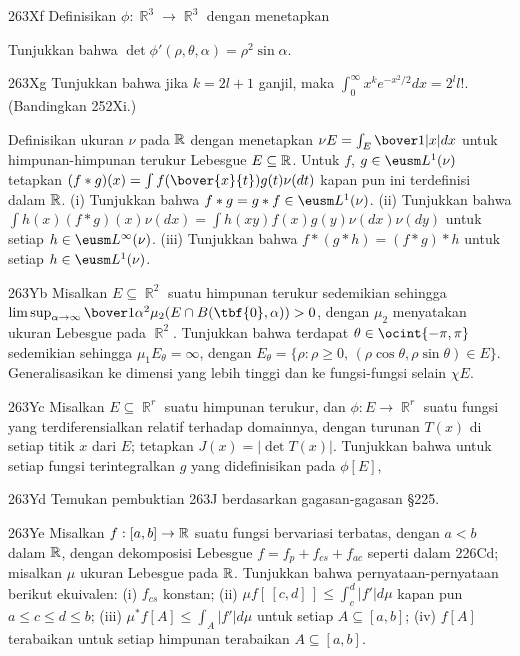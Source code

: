 {\sqheader 263Xf Definisikan $\phi:\BbbR^3\to\BbbR^3$ dengan
menetapkan


\noindent Tunjukkan bahwa $\det\phi'(\rho,\theta,\alpha)=\rho^2\sin\alpha$.

\spheader 263Xg Tunjukkan bahwa jika $k=2l+1$ ganjil, maka
$\int_0^{\infty}x^ke^{-x^2/2}dx=2^ll!$.   (Bandingkan 252Xi.)

Definisikan ukuran $\nu$ pada $\Bbb R$ dengan menetapkan
$\nu E=\int_E\bover1{|x|}dx$ untuk himpunan-himpunan terukur Lebesgue
$E\subseteq\Bbb R$.   Untuk $f$, $g\in\eusm L^1(\nu)$ tetapkan
$(f*g)(x)=\int f(\bover{x}{t})g(t)\nu(dt)$ kapan pun ini terdefinisi dalam
$\Bbb R$.   (i) Tunjukkan bahwa $f*g=g*f\in\eusm L^1(\nu)$.   (ii) Tunjukkan bahwa
$\int h(x)(f*g)(x)\nu(dx)=\int h(xy)f(x)g(y)\nu(dx)\nu(dy)$ untuk setiap
$h\in\eusm L^{\infty}(\nu)$.   (iii) Tunjukkan bahwa $f*(g*h)=(f*g)*h$ untuk
setiap $h\in\eusm L^1(\nu)$.   

\spheader 263Yb Misalkan $E\subseteq\BbbR^2$ suatu himpunan terukur sedemikian sehingga
$\limsup_{\alpha\to\infty}
\bover1{\alpha^2}\mu_2(E\cap B(\tbf{0},\alpha))>0$, dengan $\mu_2$ menyatakan
ukuran Lebesgue pada
$\BbbR^2$.   Tunjukkan bahwa terdapat $\theta\in\ocint{-\pi,\pi}$ sedemikian sehingga
$\mu_1E_{\theta}=\infty$, dengan
$E_{\theta}=\{\rho:\rho\ge 0,\,(\rho\cos\theta,\rho\sin\theta)\in E\}$.
Generalisasikan ke dimensi yang lebih tinggi dan ke fungsi-fungsi selain $\chi E$.

\spheader 263Yc Misalkan $E\subseteq\BbbR^r$ suatu himpunan terukur,
dan $\phi:E\to\BbbR^r$ suatu fungsi yang terdiferensialkan relatif terhadap domainnya,
dengan turunan $T(x)$ di setiap titik $x$ dari $E$;  tetapkan
$J(x)=|\det T(x)|$.
Tunjukkan bahwa untuk setiap fungsi terintegralkan $g$ yang didefinisikan pada $\phi[E]$,


\spheader 263Yd Temukan pembuktian 263J berdasarkan gagasan-gagasan \S225.

\spheader 263Ye Misalkan $f:[a,b]\to\Bbb R$ suatu fungsi bervariasi terbatas,
dengan $a<b$ dalam $\Bbb R$, dengan dekomposisi Lebesgue
$f=f_p+f_{cs}+f_{ac}$ seperti dalam 226Cd;  misalkan $\mu$ ukuran Lebesgue pada
$\Bbb R$.   Tunjukkan bahwa pernyataan-pernyataan berikut ekuivalen:  (i) $f_{cs}$
konstan;  (ii) $\mu f[\,[c,d]\,]\le\int_c^d|f'|d\mu$ kapan pun
$a\le c\le d\le b$;   (iii)
$\mu^*f[A]\le\int_A|f'|d\mu$ untuk setiap $A\subseteq[a,b]$;   (iv) $f[A]$
terabaikan untuk setiap himpunan terabaikan $A\subseteq[a,b]$.   

}
